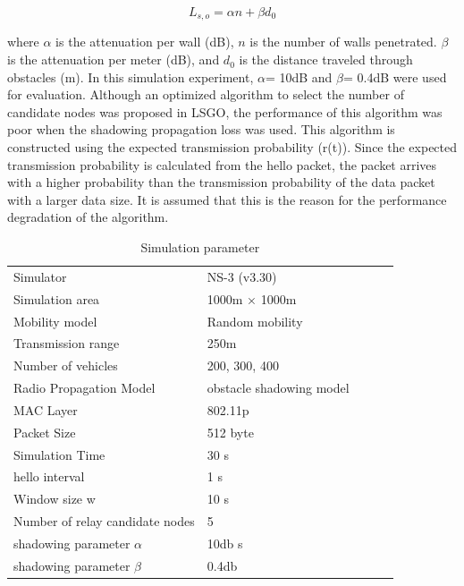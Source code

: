 \documentclass[conference]{IEEEtran}
\begin{document}
\begin{equation}
\label{shadowing}
L_{s,o} = \alpha n  + \beta d_0
\end{equation}

where $\alpha$ is the attenuation per wall (dB), $n$ is the number of walls penetrated. 
$\beta$ is the attenuation per meter (dB), and $d_0$ is the distance traveled through obstacles (m). 
In this simulation experiment, $\alpha$= 10dB and $\beta$= 0.4dB were used for evaluation. Although an optimized algorithm to select the number of candidate nodes was proposed in LSGO, the performance of this algorithm was poor when the shadowing propagation loss was used. This algorithm is constructed using the expected transmission probability (r(t)). Since the expected transmission probability is calculated from the hello packet, the packet arrives with a higher probability than the transmission probability of the data packet with a larger data size. It is assumed that this is the reason for the performance degradation of the algorithm. 



\begin{table}[!ht]
\begin{center}
\caption{Simulation parameter}
\label{tab:parameter}
\begin{tabular}{|l|l|lll}
\cline{1-2}
Simulator    & NS-3 (v3.30) &  &  &  \\ \cline{1-2}
Simulation area    & 1000m × 1000m   &  &  &  \\ \cline{1-2}
Mobility model     & Random mobility &  &  &  \\ \cline{1-2}
Transmission range & 250m            &  &  &  \\ \cline{1-2}
Number of vehicles & 200, 300, 400      &  &  &  \\ \cline{1-2}
Radio Propagation Model    & obstacle shadowing model &  &  &  \\ \cline{1-2}
MAC Layer     & 802.11p &  &  &  \\ \cline{1-2}
Packet Size & 512 byte       &  &  &  \\ \cline{1-2}
Simulation Time & 30 s      &  &  &  \\ \cline{1-2}
hello interval & 1 s      &  &  &  \\ \cline{1-2}
Window size w  & 10 s      &  &  &  \\ \cline{1-2}
Number of relay candidate nodes  & 5      &  &  &  \\ \cline{1-2}
shadowing parameter $\alpha$  & 10db s      &  &  &  \\ \cline{1-2}
shadowing parameter $\beta$    & 0.4db &  &  \\ \cline{1-2}
\end{tabular}
\end{center}
\end{table}
\end{document}
